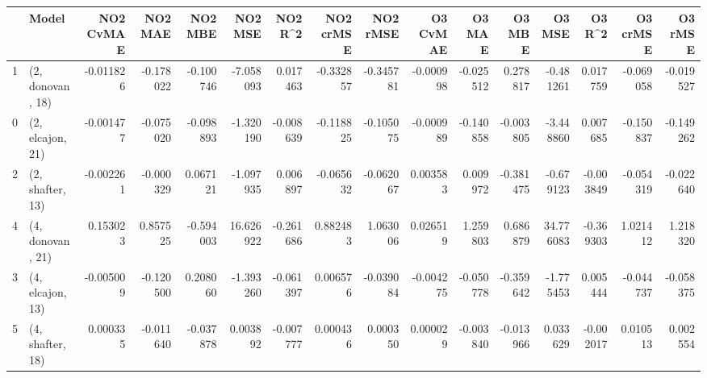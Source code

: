 \begin{tabular}{llrrrrrrrrrrrrrr}
\toprule
{} &             Model &  NO2 CvMAE &   NO2 MAE &   NO2 MBE &    NO2 MSE &   NO2 R\textasciicircum2 &  NO2 crMSE &  NO2 rMSE &  O3 CvMAE &    O3 MAE &    O3 MBE &     O3 MSE &    O3 R\textasciicircum2 &  O3 crMSE &   O3 rMSE \\
\midrule
1 &  (2, donovan, 18) &  -0.011826 & -0.178022 & -0.100746 &  -7.058093 &  0.017463 &  -0.332857 & -0.345781 & -0.000998 & -0.025512 &  0.278817 &  -0.481261 &  0.017759 & -0.069058 & -0.019527 \\
0 &  (2, elcajon, 21) &  -0.001477 & -0.075020 & -0.098893 &  -1.320190 & -0.008639 &  -0.118825 & -0.105075 & -0.000989 & -0.140858 & -0.003805 &  -3.448860 &  0.007685 & -0.150837 & -0.149262 \\
2 &  (2, shafter, 13) &  -0.002261 & -0.000329 &  0.067121 &  -1.097935 &  0.006897 &  -0.065632 & -0.062067 &  0.003583 &  0.009972 & -0.381475 &  -0.679123 & -0.003849 & -0.054319 & -0.022640 \\
4 &  (4, donovan, 21) &   0.153023 &  0.857525 & -0.594003 &  16.626922 & -0.261686 &   0.882483 &  1.063006 &  0.026519 &  1.259803 &  0.686879 &  34.776083 & -0.369303 &  1.021412 &  1.218320 \\
3 &  (4, elcajon, 13) &  -0.005009 & -0.120500 &  0.208060 &  -1.393260 & -0.061397 &   0.006576 & -0.039084 & -0.004275 & -0.050778 & -0.359642 &  -1.775453 &  0.005444 & -0.044737 & -0.058375 \\
5 &  (4, shafter, 18) &   0.000335 & -0.011640 & -0.037878 &   0.003892 & -0.007777 &   0.000436 &  0.000350 &  0.000029 & -0.003840 & -0.013966 &   0.033629 & -0.002017 &  0.010513 &  0.002554 \\
\bottomrule
\end{tabular}

